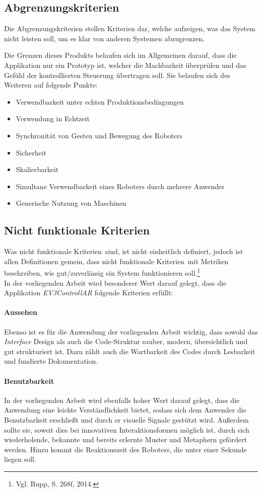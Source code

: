 \subsection{Abgrenzungskriterien}
Die Abgrenzungskriterien stellen Kriterien dar, welche aufzeigen, was das System nicht leisten soll, um es klar von anderen Systemen abzugrenzen.

Die Grenzen dieses Produkts belaufen sich im Allgemeinen darauf, dass die Applikation nur ein Prototyp ist, welcher die Machbarkeit überprüfen und das Gefühl der kontrollierten Steuerung übertragen soll. Sie belaufen sich des Weiteren auf folgende Punkte:
\begin{itemize}
	\item Verwendbarkeit unter echten Produktionsbedingungen
	\item Verwendung in Echtzeit
	\item Synchronität von Gesten und Bewegung des Roboters
	\item Sicherheit
	\item Skalierbarkeit
	\item Simultane Verwendbarkeit eines Roboters durch mehrere Anwender
	\item Generische Nutzung von Maschinen
\end{itemize}
\subsection{Nicht funktionale Kriterien}
Was \frqq nicht funktionale Kriterien\flqq\ sind, ist nicht einheitlich definiert, jedoch ist allen Definitionen gemein, dass \frqq nicht funktionale Kriterien\flqq\ mit Metriken beschreiben, wie gut/zuverlässig ein System funktionieren soll.\footnote{ Vgl. Rupp, S. 268f, 2014.}\\
In der vorliegenden Arbeit wird besonderer Wert darauf gelegt, dass die Applikation \textit{EV3ControllAR} folgende Kriterien erfüllt:
\paragraph*{Aussehen}
Ebenso ist es für die Anwendung der vorliegenden Arbeit wichtig, dass sowohl das \textit{Interface} Design als auch die Code-Struktur sauber, modern, übersichtlich und gut strukturiert ist. Dazu zählt auch die Wartbarkeit des Codes durch Lesbarkeit und fundierte Dokumentation.
\paragraph*{Benutzbarkeit}
In der vorliegenden Arbeit wird ebenfalls hoher Wert darauf gelegt, dass die Anwendung eine leichte Verständlichkeit bietet, sodass sich dem Anwender die Benutzbarkeit erschließt und durch er visuelle Signale gestützt wird. Außerdem sollte sie, soweit dies bei innovativen Interaktionsformen möglich ist, durch sich wiederholende, bekannte und bereits erlernte Muster und Metaphern gefördert werden. Hinzu kommt die Reaktionszeit des Roboters, die unter einer Sekunde liegen soll.
